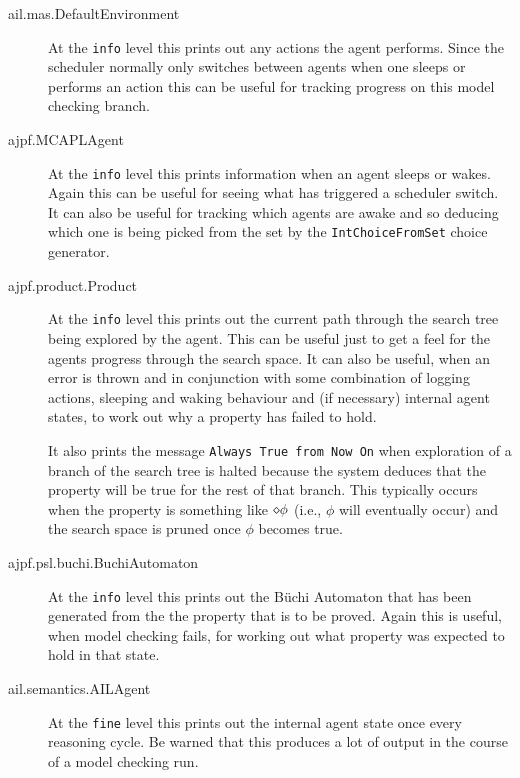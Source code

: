 \begin{description}
\item[ail.mas.DefaultEnvironment] At the \texttt{info} level this prints out any actions the agent performs.  Since the scheduler normally only switches between agents when one sleeps or performs an action this can be useful for tracking progress on this model checking branch.
\item[ajpf.MCAPLAgent] At the \texttt{info} level this prints information when an agent sleeps or wakes.  Again this can be useful for seeing what has triggered a scheduler switch.  It can also be useful for tracking which agents are awake and so deducing which one is being picked from the set by the \texttt{IntChoiceFromSet} choice generator.
\item[ajpf.product.Product] At the \texttt{info} level this prints out the current path through the search tree being explored by the agent.  This can be useful just to get a feel for the agents progress through the search space.  It can also be useful, when an error is thrown and in conjunction with some combination of logging actions, sleeping and waking behaviour and (if necessary) internal agent states, to work out why a property has failed to hold.

It also prints the message \texttt{Always True from Now On} when exploration of a branch of the search tree is halted because the system deduces that the property will be true for the rest of that branch.  This typically occurs when the property is something like $\diamond \phi$ (i.e., $\phi$ will eventually occur) and the search space is pruned once $\phi$ becomes true.
\item[ajpf.psl.buchi.BuchiAutomaton] At the \texttt{info} level this prints out the B\"{u}chi Automaton that has been generated from the the property that is to be proved.  Again this is useful, when model checking fails, for working out what property was expected to hold in that state.
\item[ail.semantics.AILAgent] At the \texttt{fine} level this prints out the internal agent state once every reasoning cycle.  Be warned that this produces a lot of output in the course of a model checking run.
\end{description}

